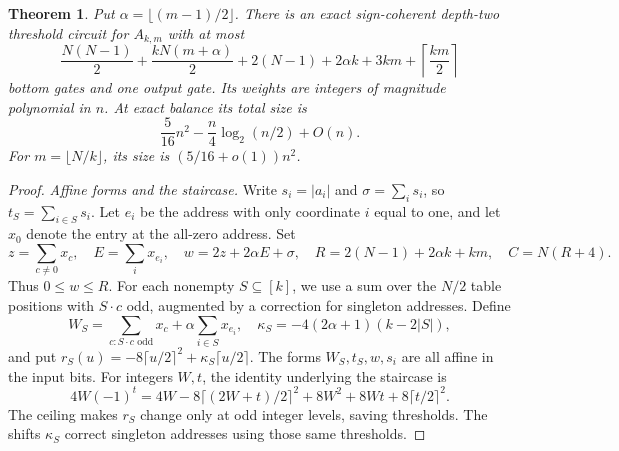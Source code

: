 \documentclass[11pt]{article}
\newtheorem{theorem}{Theorem}[section]
\begin{document}
\begin{theorem}\label{thm:exact}
Put $\alpha=\lfloor(m-1)/2\rfloor$. There is an exact sign-coherent
depth-two threshold circuit for $A_{k,m}$ with at most
\begin{equation}\label{eq:bestcount}
\frac{N(N-1)}2+\frac{kN(m+\alpha)}2
 +2(N-1)+2\alpha k+3km+\left\lceil\frac{km}{2}\right\rceil
\end{equation}
bottom gates and one output gate. Its weights are integers of magnitude
polynomial in $n$. At exact balance its total size is
$$
\frac5{16}n^2-\frac n4\log_2(n/2)+O(n).
$$
For $m=\lfloor N/k\rfloor$, its size is $(5/16+o(1))n^2$.
\end{theorem}

\begin{proof}
\emph{Affine forms and the staircase.}
Write $s_i=|a_i|$ and $\sigma=\sum_i s_i$, so
$t_S=\sum_{i\in S}s_i$. Let $e_i$ be the address with only coordinate
$i$ equal to one, and let $x_0$ denote the entry at the all-zero address.
Set
$$
z=\sum_{c\ne0}x_c,\quad E=\sum_i x_{e_i},\quad
w=2z+2\alpha E+\sigma,\quad R=2(N-1)+2\alpha k+km,\quad C=N(R+4).
$$
Thus $0\le w\le R$. For each nonempty $S\subseteq[k]$, we use a sum over the
$N/2$ table positions with $S\cdot c$ odd, augmented by a correction
for singleton addresses. Define
$$
W_S=\sum_{c:S\cdot c\text{ odd}}x_c+\alpha\sum_{i\in S}x_{e_i},\quad
\kappa_S=-4(2\alpha+1)(k-2|S|),
$$
and put $r_S(u)=-8\lceil u/2\rceil^2+\kappa_S\lceil u/2\rceil$.
The forms $W_S,t_S,w,s_i$ are all affine in the input bits.
For integers $W,t$, the identity underlying the staircase is
$$
4W(-1)^t=4W-8\lceil(2W+t)/2\rceil^2+8W^2+8Wt+8\lceil t/2\rceil^2.
$$
The ceiling makes $r_S$ change only at odd integer levels, saving
thresholds. The shifts $\kappa_S$ correct singleton addresses using
those same thresholds.


\end{proof}
\end{document}
